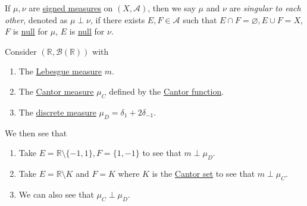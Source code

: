 \begin{definition}[Singular]\label{def:singular}
  If \(\mu,\nu\) are \hyperref[def:signed-measure]{signed measures} on \((X, \mathcal{A})\), then we say \(\mu\) and \(\nu \) are \emph{singular to each other}, denoted as
  \(\mu \perp \nu\), if there exists \(E,F \in \mathcal{A}\) such that \(E \cap F = \varnothing, E \cup F = X\), \(F\) is \hyperref[def:null-set-for-a-signed-measure]{null}
  for \(\mu\), \(E\) is \hyperref[def:null-set-for-a-signed-measure]{null} for \(\nu\).
\end{definition}

\begin{eg}
  Consider \((\mathbb{R}, \mathcal{B}(\mathbb{R}))\) with
  \begin{enumerate}
    \item The \hyperref[def:Lebesgue-measure]{Lebesgue measure} \(m\).
    \item The \hyperref[def:Cantor-measure]{Cantor measure} \(\mu_C\) defined by the \hyperref[sssec:Cantor-Function]{Cantor function}.
    \item The \hyperref[eg:discrete-measure]{discrete measure} \(\mu_D = \delta_1 + 2\delta_{-1}\).
  \end{enumerate}

  We then see that
  \begin{enumerate}
    \item Take \(E = \mathbb{R} \setminus \{-1,1\}, F = \{1,-1\}\) to see that \(m \perp \mu_D\).
    \item Take \(E = \mathbb{R} \setminus K\) and \(F = K\) where \(K\) is the \hyperref[eg:lec8:Cantor-set]{Cantor set} to see that \(m \perp \mu_C\).
    \item We can also see that \(\mu_C \perp \mu_D\).
  \end{enumerate}
\end{eg}


